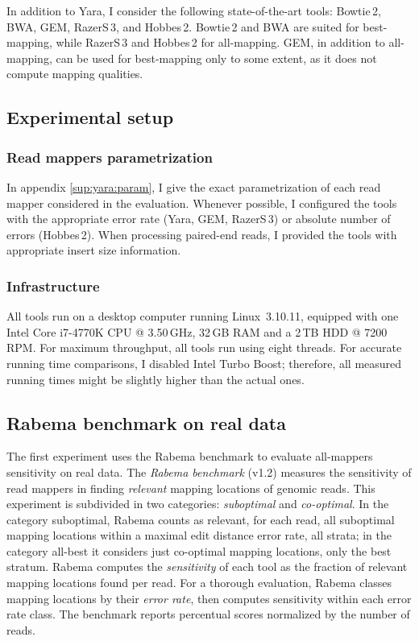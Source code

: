 In addition to Yara, I consider the following state-of-the-art tools: Bowtie\,2, BWA, GEM, RazerS\,3, and Hobbes\,2.
Bowtie\,2 and BWA are suited for best-mapping, while RazerS\,3 and Hobbes\,2 for all-mapping.
GEM, in addition to all-mapping, can be used for best-mapping only to some extent, as it does not compute mapping qualities.

\subsection{Experimental setup}

\subsubsection{Read mappers parametrization}

In appendix \ref{sup:yara:param}, I give the exact parametrization of each read mapper considered in the evaluation.
Whenever possible, I configured the tools with the appropriate error rate (Yara, GEM, RazerS\,3) or absolute number of errors (Hobbes\,2).
When processing paired-end reads, I provided the tools with appropriate insert size information.

\subsubsection{Infrastructure}

All tools run on a desktop computer running Linux~3.10.11, equipped with one Intel\textsuperscript{\textregistered} Core i7-4770K CPU @ 3.50\,GHz, 32\,GB RAM and a 2\,TB HDD @ 7200\,RPM.
For maximum throughput, all tools run using eight threads.
For accurate running time comparisons, I disabled Intel Turbo Boost; therefore, all measured running times might be slightly higher than the actual ones.

\subsection{Rabema benchmark on real data}
\label{sec:yara:eval:rabema}

The first experiment uses the Rabema benchmark to evaluate all-mappers sensitivity on real data.
The \emph{Rabema benchmark} \citep{Holtgrewe2011} (v1.2) measures the sensitivity of read mappers in finding \emph{relevant} mapping locations of genomic reads.
This experiment is subdivided in two categories: \emph{suboptimal} and \emph{co-optimal}.
In the category suboptimal, Rabema counts as relevant, for each read, all suboptimal mapping locations within a maximal edit distance error rate, \ie all strata; in the category all-best it considers just co-optimal mapping locations, \ie only the best stratum.
Rabema computes the \emph{sensitivity} of each tool as the fraction of relevant mapping locations found per read.
For a thorough evaluation, Rabema classes mapping locations by their \emph{error rate}, then computes sensitivity within each error rate class.
The benchmark reports percentual scores normalized by the number of reads.

